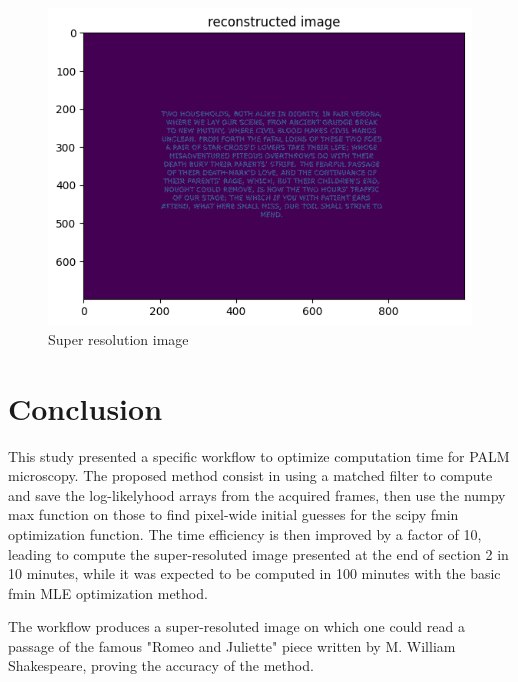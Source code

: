 \documentclass[10pt,letterpaper]{article}
\begin{document}
\begin{figure}[h]
	\centering
	\includegraphics[scale=0.65]{solved text.png}
	\caption{Super resolution image}
	\label{fig:super}
\end{figure}

\section{Conclusion}
This study presented a specific workflow to optimize computation time for PALM microscopy. The proposed method consist in using a matched filter to compute and save the log-likelyhood arrays from the acquired frames, then use the numpy max function on those to find pixel-wide initial guesses for the scipy fmin optimization function. The time efficiency is then improved by a factor of 10, leading to compute the super-resoluted image presented at the end of section 2 in 10 minutes, while it was expected to be computed in 100 minutes with the basic fmin MLE optimization method.

The workflow produces a super-resoluted image on which one could read a passage of the famous "Romeo and Juliette" piece written by M. William Shakespeare, proving the accuracy of the method.

\listoffigures
\end{document}
